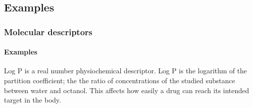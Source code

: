 \documentclass[aspectratio=169]{beamer}
\begin{document}
\subsection{Examples}

    \begin{frame}
        \frametitle{Molecular descriptors}
        \framesubtitle{Examples}
                \hfill
        \begin{minipage}[c]{0.7\textwidth}
        \alert{Log P} is a real number physiochemical descriptor. Log P is the
        logarithm of the \alert{partition coefficient}; the the \alert{ratio of
        concentrations} of the studied substance between \alert{water} and
        \alert{octanol}. This affects how easily a drug can reach its intended
        target in the body.
        \endoldBlock
        \end{minipage}
        \hfill
        \begin{minipage}[c]{0.2\textwidth}
        ~
        \end{minipage}
        \hfill
    \end{frame}

    \newcommand\tm[2][]{\tikz[overlay,remember picture,baseline=(#1.base),inner sep=0pt]\node(#1){$#2$};}
\end{document}
